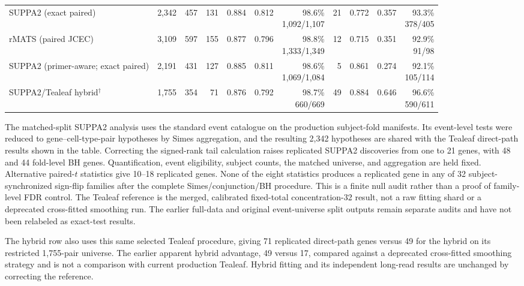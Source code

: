 \documentclass[11pt]{article}
\begin{document}
\begin{table}[H]
{\begin{tabular}{lrrrrrrrrrr}
SUPPA2 (exact paired) & 2,342 & 457 & 131 & 0.884 & 0.812 & \shortstack{98.6\%\\1,092/1,107} & 21 & 0.772 & 0.357 & \shortstack{93.3\%\\378/405}\\
rMATS (paired JCEC) & 3,109 & 597 & 155 & 0.877 & 0.796 & \shortstack{98.8\%\\1,333/1,349} & 12 & 0.715 & 0.351 & \shortstack{92.9\%\\91/98}\\
SUPPA2 (primer-aware; exact paired) & 2,191 & 431 & 127 & 0.885 & 0.811 & \shortstack{98.6\%\\1,069/1,084} & 5 & 0.861 & 0.274 & \shortstack{92.1\%\\105/114}\\
SUPPA2/Tealeaf hybrid$^{\dagger}$ & 1,755 & 354 & 71 & 0.876 & 0.792 & \shortstack{98.7\%\\660/669} & 49 & 0.884 & 0.646 & \shortstack{96.6\%\\590/611}\\
\bottomrule
\end{tabular}}
\end{table}

The matched-split SUPPA2 analysis uses the standard event catalogue on the production subject-fold manifests. Its event-level tests were reduced to gene--cell-type-pair hypotheses by Simes aggregation, and the resulting 2,342 hypotheses are shared with the Tealeaf direct-path results shown in the table. Correcting the signed-rank tail calculation raises replicated SUPPA2 discoveries from one to 21 genes, with 48 and 44 fold-level BH genes. Quantification, event eligibility, subject counts, the matched universe, and aggregation are held fixed. Alternative paired-$t$ statistics give 10--18 replicated genes. None of the eight statistics produces a replicated gene in any of 32 subject-synchronized sign-flip families after the complete Simes/conjunction/BH procedure. This is a finite null audit rather than a proof of family-level FDR control. The Tealeaf reference is the merged, calibrated fixed-total concentration-32 result, not a raw fitting shard or a deprecated cross-fitted smoothing run. The earlier full-data and original event-universe split outputs remain separate audits and have not been relabeled as exact-test results.

The hybrid row also uses this same selected Tealeaf procedure, giving 71 replicated direct-path genes versus 49 for the hybrid on its restricted 1,755-pair universe. The earlier apparent hybrid advantage, 49 versus 17, compared against a deprecated cross-fitted smoothing strategy and is not a comparison with current production Tealeaf. Hybrid fitting and its independent long-read results are unchanged by correcting the reference.
\end{document}
